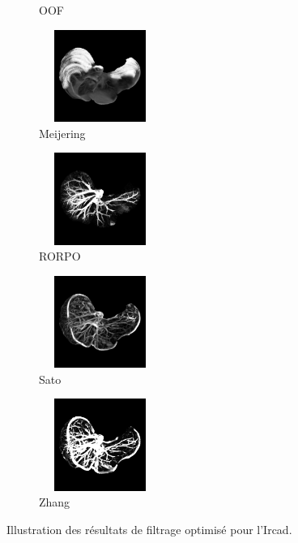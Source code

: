 \begin{figure}[!ht]
\begin{subfigure}[t]{0.32\textwidth}
  \caption{OOF}
  \end{subfigure}
  \begin{subfigure}[t]{0.32\textwidth}
  \includegraphics[clip = true, trim  =  10 150 10 150, height=3cm,width=4cm]{Images/Ircad_Meijering.png}
  \caption{Meijering}
  \end{subfigure}
  \begin{subfigure}[t]{0.32\textwidth}
  \includegraphics[clip = true, trim  =  10 150 10 150, height=3cm,width=4cm]{Images/Ircad_RORPO.png}
  \caption{RORPO}
  \end{subfigure}
  \begin{subfigure}[t]{0.32\textwidth}
  \includegraphics[clip = true, trim  =  10 150 10 150, height=3cm,width=4cm]{Images/Ircad_Sato.png}
  \caption{Sato}
  \end{subfigure}
  \begin{subfigure}[t]{0.32\textwidth}
  \includegraphics[clip = true, trim  =  10 150 10 150, height=3cm,width=4cm]{Images/Ircad_Zhang.png}
  \caption{Zhang}
  \end{subfigure}
  \centering
  \caption{Illustration des résultats de filtrage optimisé pour l'Ircad.}
  \label{fig:qualitative results Ircad}
  \end{figure}

